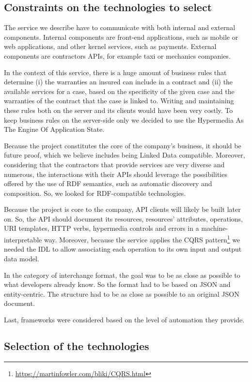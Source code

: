 \subsection{Constraints on the technologies to select}

The service we describe have to communicate with both internal and external components. Internal components are front-end applications, such as mobile or web applications, and other kernel services, such as payments. External components are contractors APIs, for example taxi or mechanics companies. 

In the context of this service, there is a huge amount of business rules that determine (i) the warranties an insured can include in a contract and (ii) the available services for a case, based on the specificity of the given case and the warranties of the contract that the case is linked to. Writing and maintaining these rules both on the server and its clients would have been very costly. To keep business rules on the server-side only we decided to use the Hypermedia As The Engine Of Application State.

Because the project constitutes the core of the company's business, it should be future proof, which we believe includes being Linked Data compatible. Moreover, considering that the contractors that provide services are very diverse and numerous, the interactions with their APIs should leverage the possibilities offered by the use of RDF semantics, such as automatic discovery and composition. So, we looked for RDF-compatible technologies.

Because the project is core to the company, API clients will likely be built later on. So, the API should document its resources, resources' attributes, operations, URI templates, HTTP verbs, hypermedia controls and errors in a machine-interpretable way. Moreover, because the service applies the CQRS pattern\footnote{\url{https://martinfowler.com/bliki/CQRS.html}} we needed the IDL to allow associating each operation to its own input and output data model.

In the category of interchange format, the goal was to be as close as possible to what developers already know. So the format had to be based on JSON and entity-centric. The structure had to be as close as possible to an original JSON document.

Last, frameworks were considered based on the level of automation they provide.

\subsection{Selection of the technologies}

